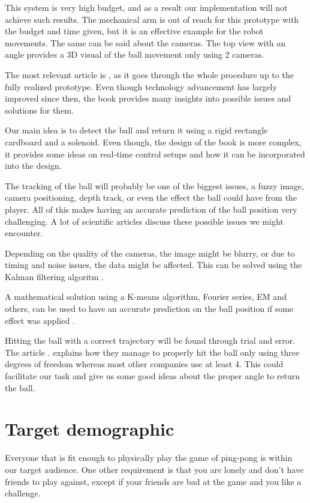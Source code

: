 This system is very high budget, and as a result our implementation will not achieve such results. The mechanical arm is out of reach for this prototype with the budget and time given, but it is an effective example for the robot movements. The same can be said about the cameras. The top view with an angle provides a 3D visual of the ball movement only using 2 cameras.

The most relevant article is \cite{Acosta2004}, as it goes through the whole procedure up to the fully realized prototype. Even though technology advancement has largely improved since then, the book provides many insights into possible issues and solutions for them.

Our main idea is to detect the ball and return it using a rigid rectangle cardboard and a solenoid. Even though, the design of the book \cite{Yu2012} is more complex, it provides some ideas on real-time control setups and how it can be incorporated into the design.

The tracking of the ball will probably be one of the biggest issues, a fuzzy image, camera positioning, depth track, or even the effect the ball could have from the player. All of this makes having an accurate prediction of the ball position very challenging. A lot of scientific articles discuss these possible issues we might encounter.

Depending on the quality of the cameras, the image might be blurry, or due to timing and noise issues, the data might be affected. This can be solved using the Kalman filtering algoritm \cite{Lu2020}.

A mathematical solution using a K-means algorithm, Fourier series, EM and others, can be used to have an accurate prediction on the ball position if some effect was applied  \cite{Zhao2017}.

Hitting the ball with a correct trajectory will be found through trial and error. The article \cite{Trasloheros2014}. explains how they manage to properly hit the ball only using three degrees of freedom whereas most other companies use at least 4. This could facilitate our task and give us some good ideas about the proper angle to return the ball.


\section{Target demographic}

Everyone that is fit enough to physically play the game of ping-pong is within our target audience. One other requirement is that you are lonely and don't have friends to play against, except if your friends are bad at the game and you like a challenge.

